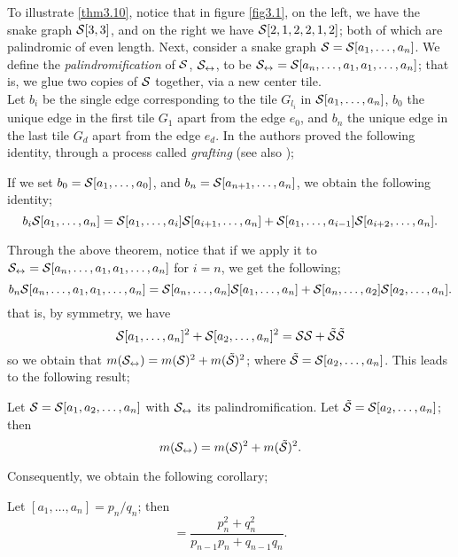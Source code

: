 To illustrate \ref{thm3.10}, notice that in figure \ref{fig3.1}, on the left, we have the snake graph $\mathcal{S}[3,3]$, and on the right we have $\mathcal{S}[2,1,2,2,1,2]$; both of which are palindromic of even length. Next, consider a snake graph $\mathcal{S}=\mathcal{S}[a_1,\dots,a_n]$. We define the \emph{palindromification} of $\mathcal{S}$, $\mathcal{S}_{\leftrightarrow}$, to be $\mathcal{S}_{\leftrightarrow} = \mathcal{S}[a_n,\dots,a_1,a_1,\dots,a_n]$; that is, we glue two copies of $\mathcal{S}$ together, via a new center tile. 
\\

Let $b_i$ be the single edge corresponding to the tile $G_{l_i}$ in $\mathcal{S}[a_1,\dots,a_n]$, $b_0$ the unique edge in the first tile $G_1$ apart from the edge $e_0$, and $b_n$ the unique edge in the last tile $G_d$ apart from the edge $e_d$. In \cite{CS2} the authors proved the following identity, through a process called \emph{grafting} (see also \cite{CS3});
\begin{theorem}\label{thm3.11}
    If we set $b_0 = \mathcal{S}[a_1,\dots,a_0]$, and $b_n = \mathcal{S}[a_{n+1},\dots,a_n]$, we obtain the following identity;
\begin{equation*}
    b_i\mathcal{S}[a_1,\dots,a_n] = \mathcal{S}[a_1,\dots,a_i]\mathcal{S}[a_{i+1},\dots,a_n]+\mathcal{S}[a_1,\dots,a_{i-1}]\mathcal{S}[a_{i+2},\dots,a_n].
\end{equation*}
\end{theorem}
Through the above theorem, notice that if we apply it to $\mathcal{S}_{\leftrightarrow} = \mathcal{S}[a_n,\dots,a_1,a_1,\dots,a_n]$ for $i=n$, we get the following;
\begin{equation*}
    b_n\mathcal{S}[a_n,\dots,a_1,a_1,\dots,a_n] = \mathcal{S}[a_n,\dots,a_n]\mathcal{S}[a_1,\dots,a_n]+\mathcal{S}[a_n,\dots,a_2]\mathcal{S}[a_2,\dots,a_n].
\end{equation*}
that is, by symmetry, we have 
\begin{equation}
    \mathcal{S}[a_1,\dots,a_n]^2 + \mathcal{S}[a_2,\dots,a_n]^2 = \mathcal{S}\mathcal{S} + \Tilde{\mathcal{S}}\Tilde{\mathcal{S}}
\end{equation}
so we obtain that $m(\mathcal{S}_{\leftrightarrow}) = m(\mathcal{S})^2 + m(\Tilde{\mathcal{S}})^2$; where $\Tilde{\mathcal{S}} = \mathcal{S}[a_2,\dots,a_n]$. This leads to the following result;
\begin{theorem}\label{thm3.12}
    Let $\mathcal{S} = \mathcal{S}[a_1,a_2,\dots,a_n]$ with $\mathcal{S}_{\leftrightarrow}$ its palindromification. Let $\Tilde{\mathcal{S}} = \mathcal{S}[a_2,\dots,a_n]$; then
    \begin{equation*}
        m(\mathcal{S}_{\leftrightarrow}) = m(\mathcal{S})^2 + m(\Tilde{\mathcal{S}})^2.
    \end{equation*}
\end{theorem}
Consequently, we obtain the following corollary;
\begin{corollary}\label{cor3.10}
    Let $[a_1,\dots,a_n] = p_n/q_n$; then
    \begin{equation*}
        [a_n,\dots,a_1,a_1,\dots,a_n] = \dfrac{p_n^2 + q_n^2}{p_{n-1}p_n + q_{n-1}q_n}.
    \end{equation*}
\end{corollary}
